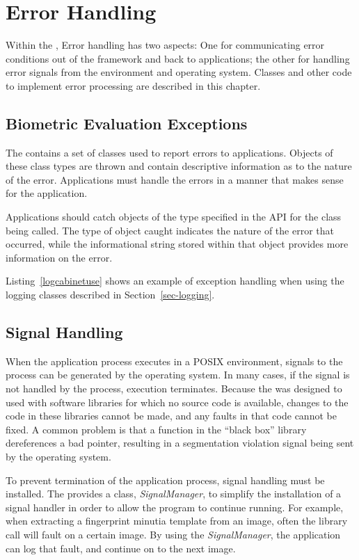 %
%
\chapter{Error Handling}
\label{chp-error}

Within the \lname, Error handling has two aspects: One for communicating
error conditions out of the framework and back to applications; the other for
handling error signals from the environment and operating system. Classes
and other code to implement error processing are described in this chapter.

\section{Biometric Evaluation Exceptions}
The \lname contains a set of classes used to report errors to applications.
Objects of these class types are thrown and contain descriptive information as
to the nature of the error. Applications must handle the errors in a manner
that makes sense for the application.

Applications should catch objects of the type specified in the API for the
class being called. The type of object caught indicates the nature of the
error that occurred, while the informational string stored within that object
provides more information on the error.

Listing~\ref{logcabinetuse} shows an example of exception handling when using
the logging classes described in Section~\ref{sec-logging}.

\section{Signal Handling}
\label{sec-signalhandling}

When the application process executes in a POSIX environment, signals to the
process can be generated by the operating system. In many cases, if the
signal is not handled by the process, execution terminates. Because the
\lname was designed to used with software libraries for which no source code
is available, changes to the code in these libraries cannot be made, and any
faults in that code cannot be fixed. A common problem is that a function in
the ``black box'' library dereferences a bad pointer, resulting in a
segmentation violation signal being sent by the operating system.

To prevent termination of the application process, signal handling must be
installed. The \lname provides a class, {\em SignalManager}, to simplify
the installation of a signal handler in order to allow the program to
continue running. For example, when extracting a fingerprint minutia template
from an image, often the library call will fault on a certain image. By using
the {\em SignalManager}, the application can log that fault, and continue on
to the next image.

